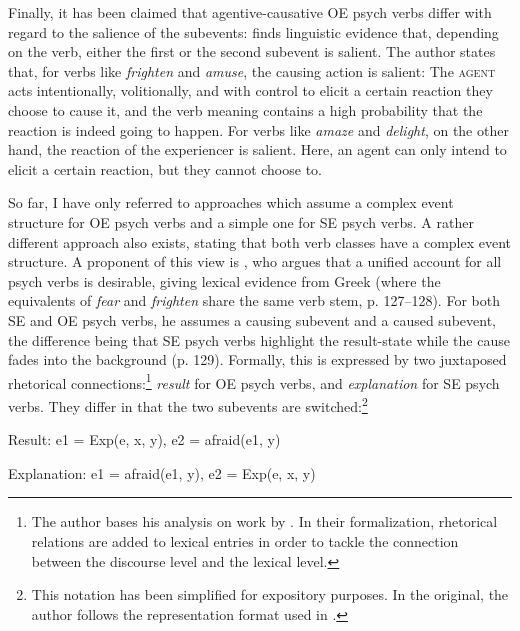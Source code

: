 Finally, it has been claimed that agentive-causative OE psych verbs differ with regard to the salience of the subevents: \citet[13, 17--18]{DiDesidero.1993} finds linguistic evidence that, depending on the verb, either the first or the second subevent is salient. The author states that, for verbs like \textit{frighten} and \textit{amuse}, the causing action is salient: 
The \textsc{agent} acts intentionally, volitionally, and with control to elicit a certain reaction \textendash{} they choose to cause it, and the verb meaning contains a high probability that the reaction is indeed going to happen. 
For verbs like \textit{amaze} and \textit{delight}, on the other hand, the reaction of the experiencer is salient. 
Here, an agent can only intend to elicit a certain reaction, but they cannot choose to. 

So far, I have only referred to approaches which assume a complex event structure for OE psych verbs and a simple one for SE psych verbs. A rather different approach also exists, stating that both verb classes have a complex event structure. A proponent of this view is \citet{Tantos.2006}, who argues that a unified account for all psych verbs is desirable,
giving lexical evidence from Greek (where the equivalents of \textit{fear} and \textit{frighten} share the same verb stem, p. 127--128). For both SE and OE psych verbs, he assumes a causing subevent and a caused subevent, the difference being that SE psych verbs highlight the result-state while the cause fades into the background (p. 129). Formally, this is expressed by two juxtaposed rhetorical connections:\footnote{The author bases his analysis on work by \citet{Asher.2000}. In their formalization, rhetorical relations are added to lexical entries in order to tackle the connection between the discourse level and the lexical level.} \textit{result} for OE psych verbs, and \textit{explanation} for SE psych verbs.
They differ in that the two subevents are switched:\footnote{This notation has been simplified for expository purposes. In the original, the author follows the representation format used in \citet{Asher.2000}.} 
	
\begin{exe}
	\ex
	\begin{xlist}
		\item Result: e1 = Exp(e, x, y), e2 = afraid(e1, y)
		\item Explanation: e1 = afraid(e1, y), e2 = Exp(e, x, y) 
	\end{xlist}
\end{exe}	
	
